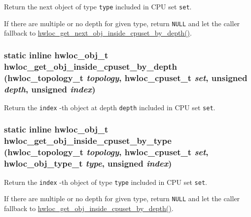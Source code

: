 Return the next object of type {\tt type} included in CPU set {\tt set}. 

If there are multiple or no depth for given type, return {\tt NULL} and let the caller fallback to \hyperlink{group__hwlocality__helper__find__inside_g9f0cdb50962d59220a557757278e1919}{hwloc\_\-get\_\-next\_\-obj\_\-inside\_\-cpuset\_\-by\_\-depth()}. \hypertarget{group__hwlocality__helper__find__inside_ge16043beea2e342c66b762854d95381f}{
\subsubsection[{hwloc\_\-get\_\-obj\_\-inside\_\-cpuset\_\-by\_\-depth}]{\setlength{\rightskip}{0pt plus 5cm}static inline {\bf hwloc\_\-obj\_\-t} hwloc\_\-get\_\-obj\_\-inside\_\-cpuset\_\-by\_\-depth ({\bf hwloc\_\-topology\_\-t} {\em topology}, \/  {\bf hwloc\_\-cpuset\_\-t} {\em set}, \/  unsigned {\em depth}, \/  unsigned {\em index})}}
\label{group__hwlocality__helper__find__inside_ge16043beea2e342c66b762854d95381f}


Return the {\tt index} -th object at depth {\tt depth} included in CPU set {\tt set}. 

\hypertarget{group__hwlocality__helper__find__inside_gcd512d31b960cfaf1defee895cb6dfff}{
\subsubsection[{hwloc\_\-get\_\-obj\_\-inside\_\-cpuset\_\-by\_\-type}]{\setlength{\rightskip}{0pt plus 5cm}static inline {\bf hwloc\_\-obj\_\-t} hwloc\_\-get\_\-obj\_\-inside\_\-cpuset\_\-by\_\-type ({\bf hwloc\_\-topology\_\-t} {\em topology}, \/  {\bf hwloc\_\-cpuset\_\-t} {\em set}, \/  {\bf hwloc\_\-obj\_\-type\_\-t} {\em type}, \/  unsigned {\em index})}}
\label{group__hwlocality__helper__find__inside_gcd512d31b960cfaf1defee895cb6dfff}


Return the {\tt index} -th object of type {\tt type} included in CPU set {\tt set}. 

If there are multiple or no depth for given type, return {\tt NULL} and let the caller fallback to \hyperlink{group__hwlocality__helper__find__inside_ge16043beea2e342c66b762854d95381f}{hwloc\_\-get\_\-obj\_\-inside\_\-cpuset\_\-by\_\-depth()}. 

